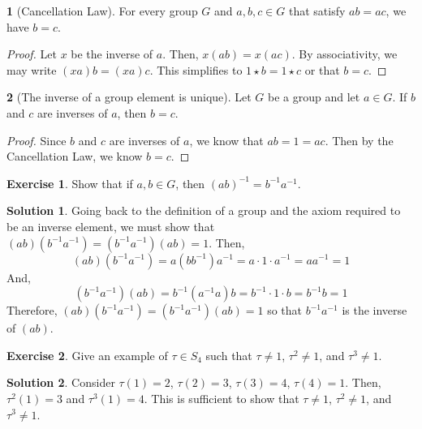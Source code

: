 \documentclass[12pt]{article}
\theoremstyle{definition}
\newtheorem{theorem}{\color{ForestGreen}{\textbf{Theorem}}}
\newtheorem{exercise}{\color{YellowOrange}Exercise}
\theoremstyle{definition}
\newtheorem{solution}{\color{Goldenrod}Solution}
\begin{document}
\begin{theorem}[Cancellation Law]
For every group $G$ and $a,b,c \in G$ that satisfy $ab = ac$, we have $b=c$.
\end{theorem}
\begin{proof}
Let $x$ be the inverse of $a$. Then, $x(ab) = x(ac)$. By associativity, we may write $(xa)b = (xa)c$. This simplifies to $1 \star b = 1 \star c$ or that $b = c$.
\end{proof}

\begin{theorem}[The inverse of a group element is unique]
Let $G$ be a group and let $a \in G$. If $b$ and $c$ are inverses of $a$, then $b = c$. 
\end{theorem}
\begin{proof}
Since $b$ and $c$ are inverses of $a$, we know that $ab = 1 = ac$. Then by the Cancellation Law, we know $b=c$.
\end{proof}

\begin{exercise}
Show that if $a,b \in G$, then $(ab)^{-1} = b^{-1}a^{-1}$.
\end{exercise}
\begin{solution} Going back to the definition of a group and the axiom required to be an inverse element, we must show that $(ab)(b^{-1}a^{-1}) = (b^{-1}a^{-1})(ab) = 1$. Then,
\begin{equation}
(ab)(b^{-1}a^{-1}) = a (bb^{-1}) a^{-1} = a \cdot 1 \cdot a^{-1} = aa^{-1} = 1
\end{equation}
And,
\begin{equation}
(b^{-1}a^{-1})(ab) = b^{-1} (a^{-1}a) b = b^{-1} \cdot 1 \cdot b = b^{-1}b = 1
\end{equation}
Therefore, $(ab)(b^{-1}a^{-1}) = (b^{-1}a^{-1})(ab) = 1$ so that $b^{-1}a^{-1}$ is the inverse of $(ab)$.
\end{solution}

\begin{exercise}
Give an example of $\tau \in S_4$ such that $\tau \neq 1$, $\tau^2 \neq 1$, and $\tau^3 \neq 1$.
\end{exercise}
\begin{solution}
Consider $\tau(1) = 2$, $\tau(2) = 3$, $\tau(3) = 4$, $\tau(4) = 1$. Then, $\tau^2(1) = 3$ and $\tau^3(1) = 4$. This is sufficient to show that $\tau \neq 1$, $\tau^2 \neq 1$, and $\tau^3 \neq 1$.
\end{solution}
\end{document}

